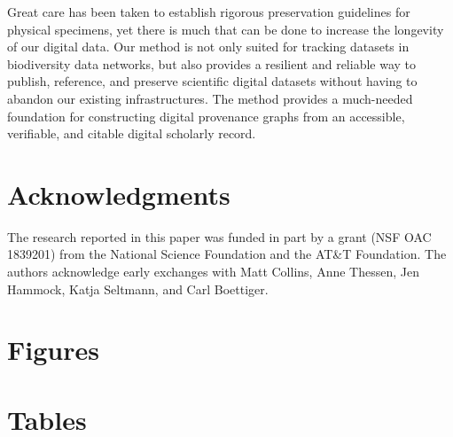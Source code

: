 Great care has been taken to establish rigorous preservation guidelines for physical specimens, yet there is much that can be done to increase the longevity of our digital data. Our method is not only suited for tracking datasets in biodiversity data networks, but also provides a resilient and reliable way to publish, reference, and preserve scientific digital datasets without having to abandon our existing infrastructures. The method provides a much-needed foundation for constructing digital provenance graphs from an accessible, verifiable, and citable digital scholarly record.


\section*{Acknowledgments}
The research reported in this paper was funded in part by a grant (NSF OAC 1839201) from the National Science Foundation and the AT\&T Foundation. The authors acknowledge early exchanges with Matt Collins, Anne Thessen, Jen Hammock, Katja Seltmann, and Carl Boettiger.

\nolinenumbers







\newpage
\section*{Figures}








\clearpage
\newpage
\section*{Tables}




